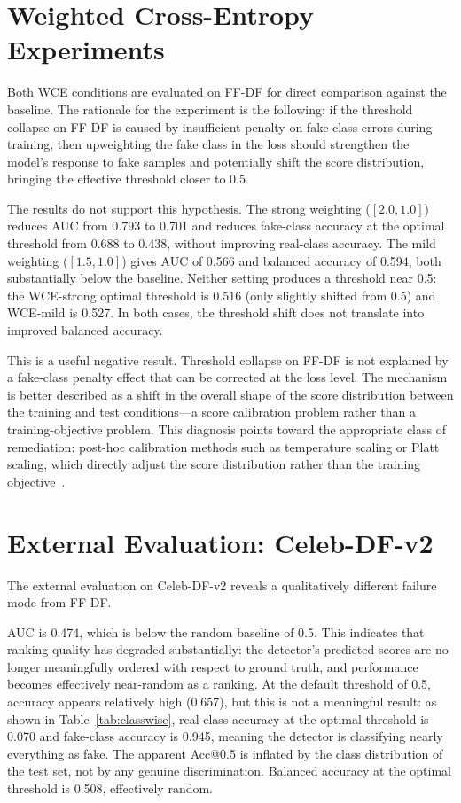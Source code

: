\documentclass[a4paper,12pt]{report}
\begin{document}
\section{Weighted Cross-Entropy Experiments}
\label{sec:wce}

Both WCE conditions are evaluated on FF-DF for direct
comparison against the baseline.
The rationale for the experiment is the following: if
the threshold collapse on FF-DF is caused by insufficient
penalty on fake-class errors during training, then
upweighting the fake class in the loss should strengthen
the model's response to fake samples and potentially
shift the score distribution, bringing the effective
threshold closer to 0.5.

The results do not support this hypothesis.
The strong weighting ($[2.0, 1.0]$) reduces AUC from
0.793 to 0.701 and reduces fake-class accuracy at the
optimal threshold from 0.688 to 0.438, without improving
real-class accuracy.
The mild weighting ($[1.5, 1.0]$) gives AUC of 0.566
and balanced accuracy of 0.594, both substantially below
the baseline.
Neither setting produces a threshold near 0.5: the
WCE-strong optimal threshold is 0.516 (only slightly
shifted from 0.5) and WCE-mild is 0.527.
In both cases, the threshold shift does not translate
into improved balanced accuracy.

This is a useful negative result.
Threshold collapse on FF-DF is not explained by a
fake-class penalty effect that can be corrected at the
loss level.
The mechanism is better described as a shift in the
overall shape of the score distribution between the
training and test conditions---a score calibration
problem rather than a training-objective problem.
This diagnosis points toward the appropriate class of
remediation: post-hoc calibration methods such as
temperature scaling or Platt scaling, which directly
adjust the score distribution rather than the training
objective~\cite{aigicalib2025}.

\section{External Evaluation: Celeb-DF-v2}
\label{sec:external}

The external evaluation on Celeb-DF-v2 reveals a
qualitatively different failure mode from FF-DF.

AUC is 0.474, which is below the random baseline of 0.5.
This indicates that ranking quality has degraded
substantially: the detector's predicted scores are no
longer meaningfully ordered with respect to ground truth,
and performance becomes effectively near-random as a
ranking.
At the default threshold of 0.5, accuracy appears
relatively high (0.657), but this is not a meaningful
result: as shown in Table~\ref{tab:classwise},
real-class accuracy at the optimal threshold is 0.070
and fake-class accuracy is 0.945, meaning the detector
is classifying nearly everything as fake.
The apparent Acc@0.5 is inflated by the class distribution
of the test set, not by any genuine discrimination.
Balanced accuracy at the optimal threshold is 0.508,
effectively random.
\end{document}
